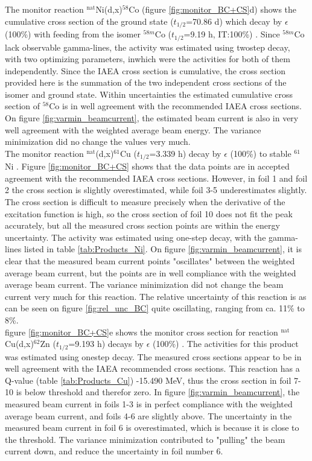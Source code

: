\noindent 
The monitor reaction $^\text{nat}$Ni(d,x)$^{58}$Co (figure \ref{fig:monitor_BC+CS}d) shows the cumulative cross section of the ground state ($t_{1/2}$=70.86 d) which decay by $\epsilon$ (100\%) with feeding from the isomer $^{58m}$Co ($t_{1/2}$=9.19 h, IT:100\%) \cite{Nesaraja2010}. Since $^{58m}$Co lack observable gamma-lines, the activity was estimated using twostep decay, with two optimizing parameters, inwhich were the activities for both of them independently. Since the IAEA cross section is cumulative, the cross section provided here is the summation of the two independent cross sections of the isomer and ground state. Within uncertainties the estimated cumulative cross section of $^{58}$Co is in well agreement with the recommended IAEA cross sections. On figure \ref{fig:varmin_beamcurrent}, the estimated beam current is also in very well agreement with the weighted average beam energy. The variance minimization did no change the values very much.    \\

\noindent 
The monitor reaction $^\text{nat}$(d,x)$^{61}$Cu ($t_{1/2}$=3.339 h) decay by $\epsilon$ (100\%) to stable $^{61}$Ni \cite{Zuber2015}. Figure \ref{fig:monitor_BC+CS} shows that the data points are in accepted agreement with the recommended IAEA cross sections\cite{Hermanne2018a}. However, in foil 1 and foil 2 the cross section is slightly overestimated, while foil 3-5 underestimates slightly. The cross section is difficult to measure precisely when the derivative of the excitation function is high, so the cross section of foil 10 does not fit the peak accurately, but all the measured cross section points are within the energy uncertainty. The activity was estimated using one-step decay, with the gamma-lines listed in table \ref{tab:Products_Ni}. On figure \ref{fig:varmin_beamcurrent}, it is clear that the measured beam current points "oscillates" between the weighted average beam current, but the points are in well compliance with the weighted average beam current. The variance minimization did not change the beam current very much for this reaction. The relative uncertainty of this reaction is as can be seen on figure \ref{fig:rel_unc_BC} quite oscillating, ranging from ca. 11\% to 8\%.  \\

\noindent
figure \ref{fig:monitor_BC+CS}e shows the monitor cross section for reaction $^\text{nat}$Cu(d,x)$^{62}$Zn ($t_{1/2}$=9.193 h) decays by $\epsilon$ (100\%) \cite{Nichols2012}. The activities for this product was estimated using onestep decay. The measured cross sections appear to be in well agreement with the IAEA recommended cross sections. This reaction has a Q-value (table \ref{tab:Products_Cu}) -15.490 MeV, thus the cross section in foil 7-10 is below threshold and therefor zero. In figure \ref{fig:varmin_beamcurrent}, the measured beam current in foils 1-3 is in perfect compliance with the weighted average beam current, and foils 4-6 are slightly above. The uncertainty in the measured beam current in foil 6 is overestimated, which is because it is close to the threshold. The variance minimization contributed to "pulling" the beam current down, and reduce the uncertainty in foil number 6. \\

